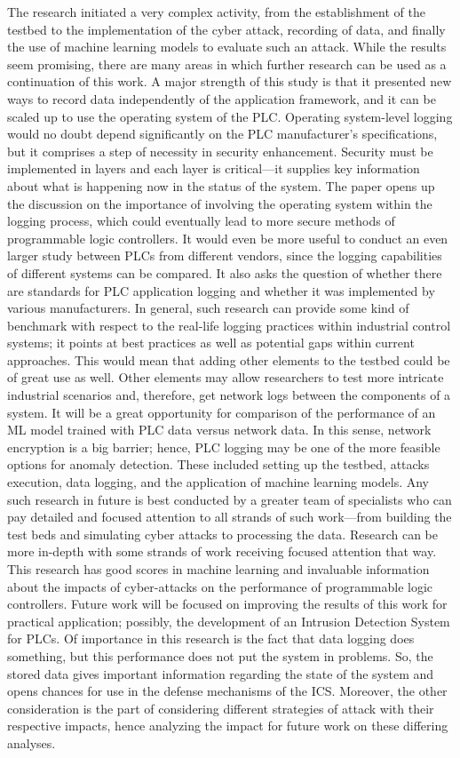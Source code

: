\documentclass[Master,BMR,english]{twbook}
\begin{document}
The research initiated a very complex activity, from the establishment of the testbed to the implementation of the cyber attack, recording of data, and finally the use of machine learning models to evaluate such an attack. While the results seem promising, there are many areas in which further research can be used as a continuation of this work. A major strength of this study is that it presented new ways to record data independently of the application framework, and it can be scaled up to use the operating system of the PLC. Operating system-level logging would no doubt depend significantly on the PLC manufacturer's specifications, but it comprises a step of necessity in security enhancement. Security must be implemented in layers and each layer is critical—it supplies key information about what is happening now in the status of the system. The paper opens up the discussion on the importance of involving the operating system within the logging process, which could eventually lead to more secure methods of programmable logic controllers. It would even be more useful to conduct an even larger study between PLCs from different vendors, since the logging capabilities of different systems can be compared. It also asks the question of whether there are standards for PLC application logging and whether it was implemented by various manufacturers. In general, such research can provide some kind of benchmark with respect to the real-life logging practices within industrial control systems; it points at best practices as well as potential gaps within current approaches. This would mean that adding other elements to the testbed could be of great use as well. Other elements may allow researchers to test more intricate industrial scenarios and, therefore, get network logs between the components of a system. It will be a great opportunity for comparison of the performance of an ML model trained with PLC data versus network data. In this sense, network encryption is a big barrier; hence, PLC logging may be one of the more feasible options for anomaly detection. These included setting up the testbed, attacks execution, data logging, and the application of machine learning models. Any such research in future is best conducted by a greater team of specialists who can pay detailed and focused attention to all strands of such work—from building the test beds and simulating cyber attacks to processing the data. Research can be more in-depth with some strands of work receiving focused attention that way. This research has good scores in machine learning and invaluable information about the impacts of cyber-attacks on the performance of programmable logic controllers. Future work will be focused on improving the results of this work for practical application; possibly, the development of an Intrusion Detection System for PLCs. Of importance in this research is the fact that data logging does something, but this performance does not put the system in problems. So, the stored data gives important information regarding the state of the system and opens chances for use in the defense mechanisms of the ICS. Moreover, the other consideration is the part of considering different strategies of attack with their respective impacts, hence analyzing the impact for future work on these differing analyses. 
\end{document}
